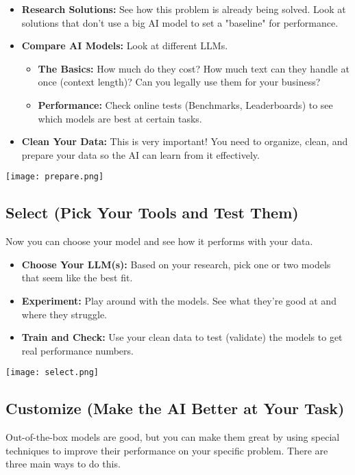 \begin{itemize}
    \item \textbf{Research Solutions:} See how this problem is already being solved. Look at solutions that don't use a big AI model to set a "baseline" for performance.
    \item \textbf{Compare AI Models:} Look at different LLMs.
    \begin{itemize}
        \item \textbf{The Basics:} How much do they cost? How much text can they handle at once (context length)? Can you legally use them for your business?
        \item \textbf{Performance:} Check online tests (Benchmarks, Leaderboards) to see which models are best at certain tasks.
    \end{itemize}
    \item \textbf{Clean Your Data:} This is very important! You need to organize, clean, and prepare your data so the AI can learn from it effectively.
\end{itemize}
\begin{center}
\texttt{[image: prepare.png]}
\end{center}

\newpage
\subsection{Select (Pick Your Tools and Test Them)}
Now you can choose your model and see how it performs with your data.

\begin{itemize}
    \item \textbf{Choose Your LLM(s):} Based on your research, pick one or two models that seem like the best fit.
    \item \textbf{Experiment:} Play around with the models. See what they're good at and where they struggle.
    \item \textbf{Train and Check:} Use your clean data to test (validate) the models to get real performance numbers.
\end{itemize}
\begin{center}
\texttt{[image: select.png]}
\end{center}
\newpage
\subsection{Customize (Make the AI Better at Your Task)}
Out-of-the-box models are good, but you can make them great by using special techniques to improve their performance on your specific problem. There are three main ways to do this.

